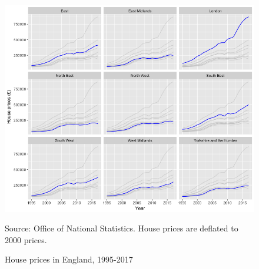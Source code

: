 \documentclass[12pt,letterpaper]{article}
\begin{document}
\newpage

\begin{figure}[h!]
  
\begin{minipage}{\textwidth}
\includegraphics[width=1\textwidth]{house_prices_england_deflated.png}
\begin{flushright}
{\footnotesize Source: Office of National Statistics. House prices are deflated to 2000 prices.\par}
\end{flushright}
\end{minipage}
\caption{House prices in England, 1995-2017}
\label{fig: house_prices}
\end{figure}

\newpage
\end{document}
